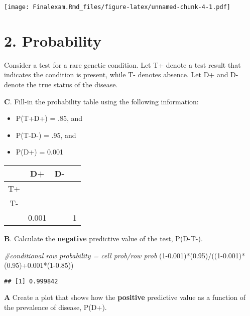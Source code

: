 \documentclass[
]{article}
\newenvironment{Shaded}{\begin{snugshade}}{\end{snugshade}}
\newcommand{\CommentTok}[1]{\textcolor[rgb]{0.56,0.35,0.01}{\textit{#1}}}
\newcommand{\DecValTok}[1]{\textcolor[rgb]{0.00,0.00,0.81}{#1}}
\newcommand{\FloatTok}[1]{\textcolor[rgb]{0.00,0.00,0.81}{#1}}
\newcommand{\NormalTok}[1]{#1}
\newcommand{\SpecialCharTok}[1]{\textcolor[rgb]{0.00,0.00,0.00}{#1}}
\providecommand{\tightlist}{%
  \setlength{\itemsep}{0pt}\setlength{\parskip}{0pt}}
\begin{document}
\texttt{[image: Finalexam.Rmd\_files/figure-latex/unnamed-chunk-4-1.pdf]}

\hypertarget{probability}{%
\section{2. Probability}\label{probability}}

Consider a test for a rare genetic condition. Let T+ denote a test
result that indicates the condition is present, while T- denotes
absence. Let D+ and D- denote the true status of the disease.

\textbf{C}. Fill-in the probability table using the following
information:

\begin{itemize}
\tightlist
\item
  P(T+\textbar D+) = .85, and
\item
  P(T-\textbar D-) = .95, and
\item
  P(D+) = 0.001
\end{itemize}

\begin{longtable}[]{@{}cccc@{}}
\toprule
& D+ & D- & \\
\midrule
\endhead
T+ & & & \\
T- & & & \\
& 0.001 & & 1 \\
\bottomrule
\end{longtable}

\textbf{B}. Calculate the \textbf{negative} predictive value of the
test, P(D-\textbar T-).

\begin{Shaded}
\begin{Highlighting}[]
\CommentTok{\#conditional row probability = cell prob/row prob}
\NormalTok{(}\DecValTok{1}\FloatTok{{-}0.001}\NormalTok{)}\SpecialCharTok{*}\NormalTok{(}\FloatTok{0.95}\NormalTok{)}\SpecialCharTok{/}\NormalTok{((}\DecValTok{1}\FloatTok{{-}0.001}\NormalTok{)}\SpecialCharTok{*}\NormalTok{(}\FloatTok{0.95}\NormalTok{)}\SpecialCharTok{+}\FloatTok{0.001}\SpecialCharTok{*}\NormalTok{(}\DecValTok{1}\FloatTok{{-}0.85}\NormalTok{))}
\end{Highlighting}
\end{Shaded}

\begin{verbatim}
## [1] 0.999842
\end{verbatim}

\textbf{A} Create a plot that shows how the \textbf{positive} predictive
value as a function of the prevalence of disease, P(D+).
\end{document}
